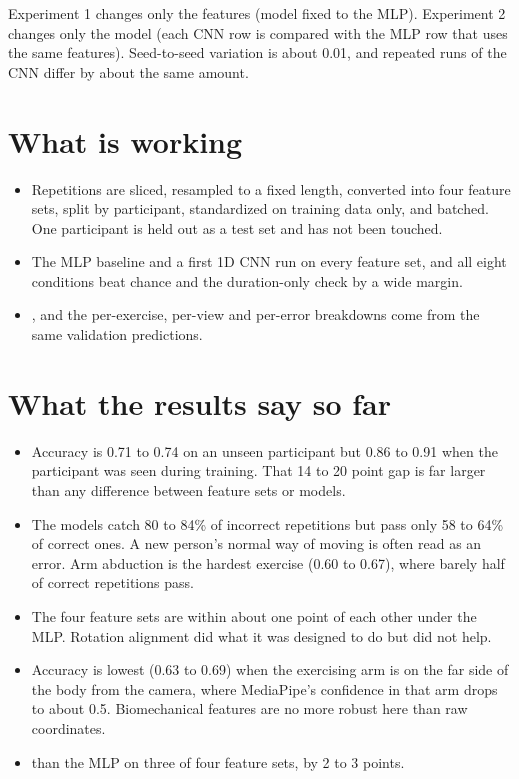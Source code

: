 Experiment 1 changes only the features (model fixed to the MLP). Experiment 2 changes only the model (each
CNN row is compared with the MLP row that uses the same features). Seed-to-seed variation is about 0.01, and
repeated runs of the CNN differ by about the same amount.

\section{What is working}

\begin{itemize}
\item {} Repetitions are sliced, resampled to a fixed length, converted into four feature
  sets, split by participant, standardized on training data only, and batched. One participant is held out
  as a test set and has not been touched.
\item {} The MLP baseline and a first 1D CNN run on every feature set, and all eight
  conditions beat chance and the duration-only check by a wide margin.
\item {}, and the per-exercise, per-view and per-error breakdowns come
  from the same validation predictions.
\end{itemize}

\section{What the results say so far}

\begin{itemize}
\item {} Accuracy is 0.71 to 0.74 on an unseen participant
  but 0.86 to 0.91 when the participant was seen during training. That 14 to 20 point gap is far larger
  than any difference between feature sets or models.
\item {} The models catch 80 to 84\% of incorrect repetitions but pass
  only 58 to 64\% of correct ones. A new person's normal way of moving is often read as an error. Arm
  abduction is the hardest exercise (0.60 to 0.67), where barely half of correct repetitions pass.
\item {} The four feature sets are within about one
  point of each other under the MLP. Rotation alignment did what it was designed to do but did not help.
\item {} Accuracy is lowest (0.63 to 0.69) when the exercising
  arm is on the far side of the body from the camera, where MediaPipe's confidence in that arm drops to
  about 0.5. Biomechanical features are no more robust here than raw coordinates.
\item {} than the MLP on three of four feature sets, by 2 to 3 points.
\end{itemize}

